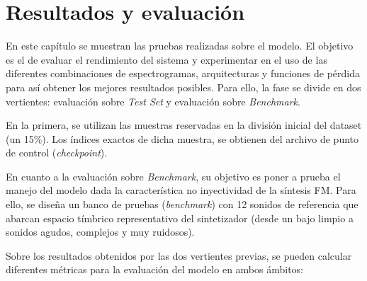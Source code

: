 \chapter{Resultados y evaluación}
\label{cap:ResultadosYEvaluacion}

En este capítulo se muestran las pruebas realizadas sobre el modelo. El objetivo es el de evaluar el rendimiento del sistema y experimentar en el uso de las
diferentes combinaciones de espectrogramas, arquitecturas y funciones de pérdida para así obtener los mejores resultados posibles. Para ello, la fase se divide en dos vertientes:
evaluación sobre \textit{Test Set} y evaluación sobre \textit{Benchmark}. 

En la primera, se utilizan las muestras reservadas en la división inicial del dataset (un 15\%).
Los índices exactos de dicha muestra, se obtienen del archivo de punto de control (\textit{checkpoint}). 

En cuanto a la evaluación sobre \textit{Benchmark}, su objetivo 
es poner a prueba el manejo del modelo dada la característica no inyectividad de la síntesis FM. Para
ello, se diseña un banco de pruebas (\textit{benchmark}) con 12 sonidos de referencia que abarcan espacio tímbrico representativo
del sintetizador (desde un bajo limpio a sonidos agudos, complejos y muy ruidosos).

Sobre los resultados obtenidos por las dos vertientes previas, se pueden calcular diferentes métricas
para la evaluación del modelo en ambos ámbitos:

